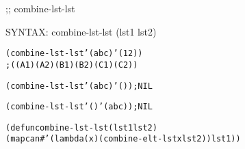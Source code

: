 \begin{aibox}{\function}
;; combine-lst-lst

SYNTAX: combine-lst-lst (lst1 lst2)
\end{aibox}

\begin{aibox}{\examples}
\begin{alltt}
(combine-lst-lst '(a b c) '(1 2))
; ((A 1) (A 2) (B 1) (B 2) (C 1) (C 2))

(combine-lst-lst '(a b c) '()); NIL

(combine-lst-lst '() '(a b c)); NIL
\end{alltt}

\end{aibox}

\begin{aibox}{\comments}

\end{aibox}
\begin{aibox}{\answers}

\end{aibox}
\begin{aibox}{\othercomments}

\end{aibox}
\begin{aibox}{\pseudocode}

\end{aibox}
\begin{aibox}{\code}

\begin{alltt}

(defun combine-lst-lst (lst1 lst2)
            (mapcan #'(lambda (x) (combine-elt-lst x lst2)) lst1))

\end{alltt}
\end{aibox}
